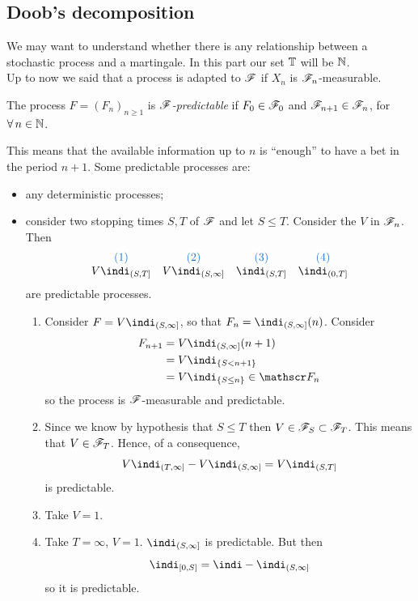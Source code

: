 \documentclass{report}
\begin{document}
\subsection{Doob's decomposition}
We may want to understand whether there is any relationship between a stochastic process and a martingale. In this part our set $\mathbb{T}$ will be $\mathbb{N}$.\\
Up to now we said that a process is adapted to $\mathscr{F}$ if $X_{n}$ is $\mathscr{F}_n$-measurable. 
\begin{definition}
	The process $F={(F_{n})}_{n\geq1}$ is \emph{$\mathscr{F}$-predictable} if $F_{0}\in\mathscr{F}_{0}$ and $\mathscr{F}_{n+1}\in\mathscr{F}_{n}$, for $\forall\, n\in\mathbb{N}$.
\end{definition}
This means that the available information up to $n$ is ``enough'' to have a bet in the period $n+1$. Some predictable processes are:
\begin{itemize}
	\item any deterministic processes;
	\item consider two stopping times $S,T$ of $\mathscr{F}$ and let $S\leq T$. Consider the \rv{} $V$ in $\mathscr{F}_{n}$. Then
	\[\begin{array}{c c c c}
	\color{DodgerBlue3}(1)&\color{DodgerBlue3}(2)&\color{DodgerBlue3}(3)&\color{DodgerBlue3}(4)\\
		V\indi_{(S,T]}&V\indi_{(S,\infty]}&\indi_{(S,T]}&\indi_{(0,T]}
	\end{array}\]
	are predictable processes.
	\begin{fancyproof}
		\begin{enumerate}
			\item[\color{DodgerBlue3}(2)] Consider $F=V\indi_{(S,\infty]}$, so that $F_{n}=\indi_{(S,\infty]}(n)$. Consider \begin{align*}
				F_{n+1}&=V\indi_{(S,\infty]}(n+1)\\
				&=V\indi_{\{S<n+1\}}\\
				&=V\indi_{\{S\leq n\}}\in\F_{n}
			\end{align*}
			so the process is $\mathscr{F}$-measurable and predictable.
			\item[\color{DodgerBlue4}(1)] Since we know by hypothesis that $S\leq T$ then $V\in\mathscr{F}_{S}\subset\mathscr{F}_{T}$. This means that $V\in\mathscr{F}_{T}$. Hence, of a consequence,
			\begin{equation*}
				V\indi_{(T,\infty]}-V\indi_{(S,\infty]}=V\indi_{(S,T]}
			\end{equation*}
			is predictable.
			\item[\color{DodgerBlue3}(3)] Take $V=1$.
			\item[\color{DodgerBlue3}(4)] Take $T=\infty$, $V=1$. $\indi_{(S,\infty]}$ is predictable. But then 
			\[\indi_{[0,S]}=\indi-\indi_{(S,\infty]}\]
			so it is predictable.
		\end{enumerate}
	\end{fancyproof}
\end{itemize}
\end{document}
